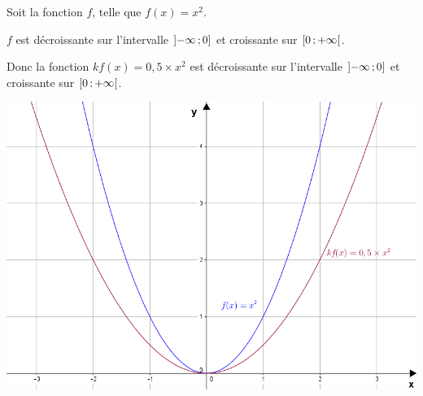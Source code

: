 \documentclass[12pt,a4paper]{article}
\begin{document}
	\begin{myex}
		
		Soit la fonction $f$, telle que $f(x) = x^2$.
		
		$f$ est décroissante sur l'intervalle $\mbox{\ensuremath{\left]-\infty\mathpunct{};0\right]}} $ et croissante sur $\mbox{\ensuremath{\left[0\mathpunct{};+\infty\right[}}$.
		
		Donc la fonction $kf(x) = 0,5 \times x^2$ est décroissante sur l'intervalle $\mbox{\ensuremath{\left]-\infty\mathpunct{};0\right]}} $ et croissante sur $\mbox{\ensuremath{\left[0\mathpunct{};+\infty\right[}}$.
		
		\begin{center}
			\includegraphics[scale=0.6]{./img/kf1}			
		\end{center}
		
	\end{myex}
	
\end{document}
